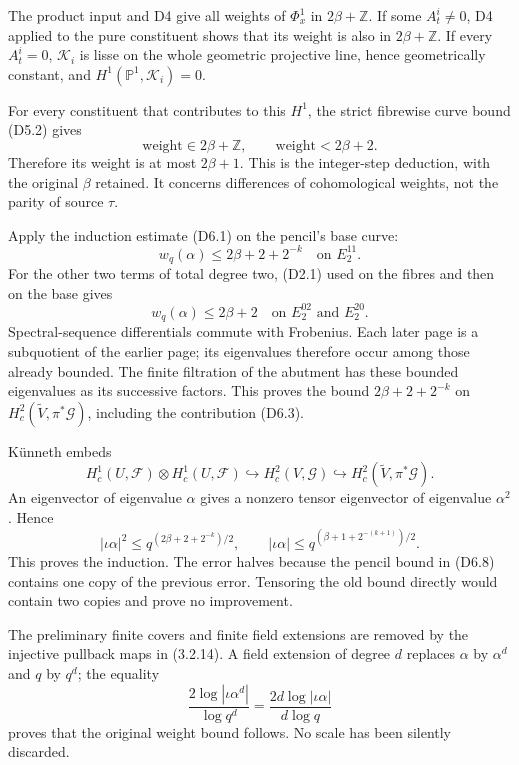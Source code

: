 The product input and D4 give all weights of \(\Phi_x^1\) in
\(2\beta+\mathbb Z\). If some \(A_t^i\ne0\), D4 applied to the pure
constituent shows that its weight is also in \(2\beta+\mathbb Z\). If
every \(A_t^i=0\), \(\mathcal K_i\) is lisse on the whole geometric
projective line, hence geometrically constant, and
\(H^1(\mathbb P^1,\mathcal K_i)=0\).

For every constituent that contributes to this \(H^1\), the strict
fibrewise curve bound (D5.2) gives \[
\text{weight}\in2\beta+\mathbb Z,\qquad
\text{weight}<2\beta+2.
\] Therefore its weight is at most \(2\beta+1\). This is the
integer-step deduction, with the original \(\beta\) retained. It
concerns differences of cohomological weights, not the parity of source
\(\tau\).

Apply the induction estimate (D6.1) on the pencil's base curve: \[
w_q(\alpha)\le2\beta+2+2^{-k}
\quad\text{on }E_2^{11}.
\tag{D6.8}
\] For the other two terms of total degree two, (D2.1) used on the
fibres and then on the base gives \[
w_q(\alpha)\le2\beta+2
\quad\text{on }E_2^{02}\text{ and }E_2^{20}.
\tag{D6.9}
\] Spectral-sequence differentials commute with Frobenius. Each later
page is a subquotient of the earlier page; its eigenvalues therefore
occur among those already bounded. The finite filtration of the abutment
has these bounded eigenvalues as its successive factors. This proves the
bound \(2\beta+2+2^{-k}\) on \(H_c^2(\widetilde V,\pi^*\mathcal G)\),
including the contribution (D6.3).

Künneth embeds \[
H_c^1(U,\mathcal F)\otimes H_c^1(U,\mathcal F)
\hookrightarrow H_c^2(V,\mathcal G)
\hookrightarrow H_c^2(\widetilde V,\pi^*\mathcal G).
\tag{D6.10}
\] An eigenvector of eigenvalue \(\alpha\) gives a nonzero tensor
eigenvector of eigenvalue \(\alpha^2\). Hence \[
|\iota\alpha|^2\le q^{(2\beta+2+2^{-k})/2},
\qquad
|\iota\alpha|\le q^{(\beta+1+2^{-(k+1)})/2}.
\tag{D6.11}
\] This proves the induction. The error halves because the pencil bound
in (D6.8) contains one copy of the previous error. Tensoring the old
bound directly would contain two copies and prove no improvement.

The preliminary finite covers and finite field extensions are removed by
the injective pullback maps in (3.2.14). A field extension of degree
\(d\) replaces \(\alpha\) by \(\alpha^d\) and \(q\) by \(q^d\); the
equality \[
\frac{2\log|\iota\alpha^d|}{\log q^d}
=\frac{2d\log|\iota\alpha|}{d\log q}
\tag{D6.12}
\] proves that the original weight bound follows. No scale has been
silently discarded.

